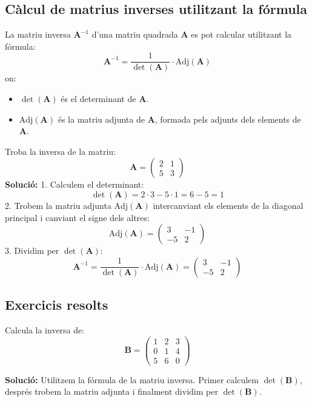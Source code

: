 \documentclass[12pt]{article}
\newcommand{\mat}[1]{\mathbf{#1}}
\begin{document}
\subsection{Càlcul de matrius inverses utilitzant la fórmula}
\begin{concept}
La matriu inversa $\mat{A}^{-1}$ d'una matriu quadrada $\mat{A}$ es pot calcular utilitzant la fórmula:
\[
\mat{A}^{-1} = \frac{1}{\det(\mat{A})} \cdot \text{Adj}(\mat{A})
\]
on:
\begin{itemize}
    \item $\det(\mat{A})$ és el determinant de $\mat{A}$.
    \item $\text{Adj}(\mat{A})$ és la matriu adjunta de $\mat{A}$, formada pels adjunts dels elements de $\mat{A}$.
\end{itemize}
\end{concept}

\begin{exemple}
Troba la inversa de la matriu:
\[
\mat{A} = \begin{pmatrix}
2 & 1 \\
5 & 3
\end{pmatrix}
\]
\textbf{Solució:}
1. Calculem el determinant:
\[
\det(\mat{A}) = 2 \cdot 3 - 5 \cdot 1 = 6 - 5 = 1
\]
2. Trobem la matriu adjunta $\text{Adj}(\mat{A})$ intercanviant els elements de la diagonal principal i canviant el signe dels altres:
\[
\text{Adj}(\mat{A}) = \begin{pmatrix}
3 & -1 \\
-5 & 2
\end{pmatrix}
\]
3. Dividim per $\det(\mat{A})$:
\[
\mat{A}^{-1} = \frac{1}{\det(\mat{A})} \cdot \text{Adj}(\mat{A}) = \begin{pmatrix}
3 & -1 \\
-5 & 2
\end{pmatrix}
\]
\end{exemple}

\subsection*{Exercicis resolts}
\begin{exercici}
Calcula la inversa de:
\[
\mat{B} = \begin{pmatrix}
1 & 2 & 3 \\
0 & 1 & 4 \\
5 & 6 & 0
\end{pmatrix}
\]

\textbf{Solució:} Utilitzem la fórmula de la matriu inversa. Primer calculem $\det(\mat{B})$, després trobem la matriu adjunta i finalment dividim per $\det(\mat{B})$.
\end{exercici}
\end{document}

